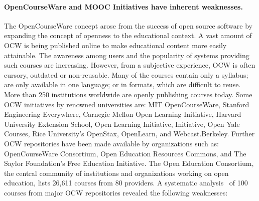 \documentclass[ngerman,UKenglish,table]{scrbook}
\begin{document}
\paragraph{OpenCourseWare and MOOC Initiatives have inherent weaknesses.}
The OpenCourseWare concept arose from the success of open source software by expanding the concept of openness to the educational context.
A vast amount of OCW is being published online to make educational content more easily attainable.
The awareness among users and the popularity of systems providing such courses are increasing.
However, from a subjective experience, OCW is often cursory, outdated or non-reusable.
Many of the courses contain only a syllabus; are only available in one language; or in formats, which are difficult to reuse.
More than 250 institutions worldwide are openly publishing courses today.
Some OCW initiatives by renowned universities are: MIT OpenCourseWare, Stanford Engineering Everywhere, Carnegie Mellon Open Learning Initiative, Harvard University Extension School, Open Learning Initiative, Initiative, Open Yale Courses, Rice University’s OpenStax, OpenLearn, and Webcast.Berkeley.
Further OCW repositories have been made available by organizations such as: OpenCourseWare Consortium, Open Education Resources Commons, and The Saylor Foundation’s Free Education Initiative.
The Open Education Consortium, the central community of institutions and organizations working on open education, lists 26,611 courses from 80 providers.
A systematic analysis~\cite{sahar_vahdati_2015_14756} of 100 courses from major OCW repositories revealed the following weaknesses:
\end{document}
